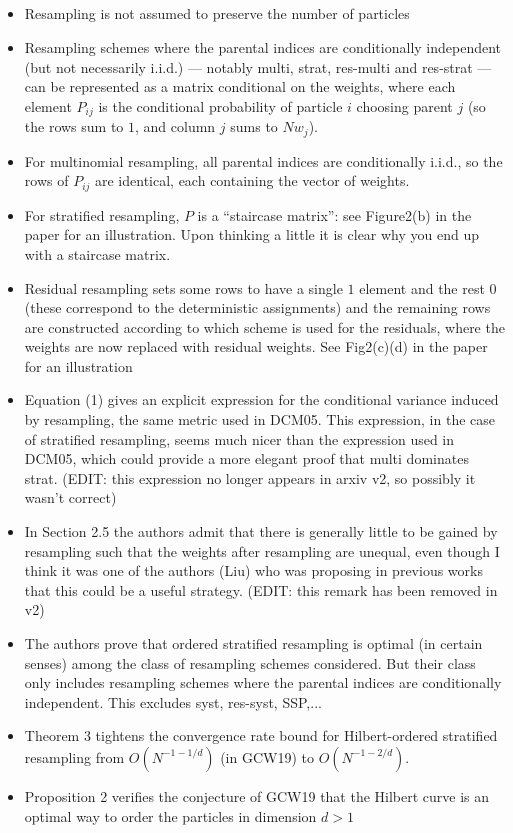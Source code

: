 \documentclass{article}
\begin{document}
\subsection*{\cite{li2020}}
\begin{itemize}
\item Resampling is not assumed to preserve the number of particles
\item Resampling schemes where the parental indices are conditionally independent (but not necessarily i.i.d.) --- notably multi, strat, res-multi and res-strat --- can be represented as a matrix conditional on the weights, where each element $P_{ij}$ is the conditional probability of particle $i$ choosing parent $j$ (so the rows sum to $1$, and column $j$ sums to $Nw_j$).
\item For multinomial resampling, all parental indices are conditionally i.i.d., so the rows of $P_{ij}$ are identical, each containing the vector of weights.
\item For stratified resampling, $P$ is a ``staircase matrix'': see Figure2(b) in the paper for an illustration. Upon thinking a little it is clear why you end up with a staircase matrix.
\item Residual resampling sets some rows to have a single $1$ element and the rest $0$ (these correspond to the deterministic assignments) and the remaining rows are constructed according to which scheme is used for the residuals, where the weights are now replaced with residual weights. See Fig2(c)(d) in the paper for an illustration
\item Equation (1) gives an explicit expression for the conditional variance induced by resampling, the same metric used in DCM05. This expression, in the case of stratified resampling, seems much nicer than the expression used in DCM05, which could provide a more elegant proof that multi dominates strat. (EDIT: this expression no longer appears in arxiv v2, so possibly it wasn't correct)
\item In Section 2.5 the authors admit that there is generally little to be gained by resampling such that the weights after resampling are unequal, even though I think it was one of the authors (Liu) who was proposing in previous works that this could be a useful strategy. (EDIT: this remark has been removed in v2)
\item The authors prove that ordered stratified resampling is optimal (in certain senses) among the class of resampling schemes considered. But their class only includes resampling schemes where the parental indices are conditionally independent. This excludes syst, res-syst, SSP,...
\item Theorem 3 tightens the convergence rate bound for Hilbert-ordered stratified resampling from $O(N^{-1-1/d})$ (in GCW19) to $O(N^{-1-2/d})$.
\item Proposition 2 verifies the conjecture of GCW19 that the Hilbert curve is an optimal way to order the particles in dimension $d>1$
\end{itemize}
\end{document}
